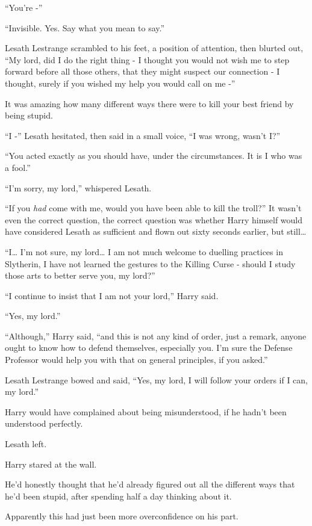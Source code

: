 ``You're -''

``Invisible. Yes. Say what you mean to say.''

Lesath Lestrange scrambled to his feet, a position of attention, then
blurted out, ``My lord, did I do the right thing - I thought you would
not wish me to step forward before all those others, that they might
suspect our connection - I thought, surely if you wished my help you
would call on me -''

It was amazing how many different ways there were to kill your best
friend by being stupid.

``I -'' Lesath hesitated, then said in a small voice, ``I was wrong,
wasn't I?''

``You acted exactly as you should have, under the circumstances. It is I
who was a fool.''

``I'm sorry, my lord,'' whispered Lesath.

``If you \emph{had} come with me, would you have been able to kill the
troll?'' It wasn't even the correct question, the correct question was
whether Harry himself would have considered Lesath as sufficient and
flown out sixty seconds earlier, but still\ldots{}

``I\ldots{} I'm not sure, my lord\ldots{} I am not much welcome to
duelling practices in Slytherin, I have not learned the gestures to the
Killing Curse - should I study those arts to better serve you, my
lord?''

``I continue to insist that I am not your lord,'' Harry said.

``Yes, my lord.''

``Although,'' Harry said, ``and this is not any kind of order, just a
remark, anyone ought to know how to defend themselves, especially you.
I'm sure the Defense Professor would help you with that on general
principles, if you asked.''

Lesath Lestrange bowed and said, ``Yes, my lord, I will follow your
orders if I can, my lord.''

Harry would have complained about being misunderstood, if he hadn't been
understood perfectly.

Lesath left.

Harry stared at the wall.

He'd honestly thought that he'd already figured out all the different
ways that he'd been stupid, after spending half a day thinking about it.

Apparently this had just been more overconfidence on his part.

